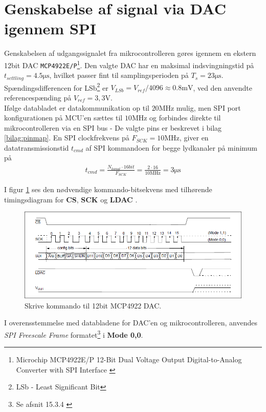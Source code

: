 \section{Genskabelse af signal via DAC igennem SPI}
Genskabelsen af udgangssignalet fra mikrocontrolleren gøres igennem en ekstern 12bit DAC \texttt{MCP4922E/P}\footnote{Microchip MCP4922E/P 12-Bit Dual Voltage Output Digital-to-Analog Converter with SPI Interface \cite{mcp4922} }.
Den valgte DAC har en maksimal indsvingningstid på $t_{settling} = \num{4.5}\si{\micro\second}$, hvilket passer fint til samplingsperioden på $T_s = 23\si{\micro\second}$. 
\\
Spændingsdifferencen for LSb\footnote{LSb - Least Significant Bit} er $ V_{LSb} = V_{ref} / 4096 \approx \num{0,8}\si{\milli\volt} $, ved den anvendte referencespænding på $V_{ref} = 3,3\si{\volt}$. 
\\
Ifølge databladet er datakommunikation op til $20\si{\mega\hertz}$ mulig, men SPI port konfigurationen på MCU'en sættes til $10\si{\mega\hertz}$ og forbindes direkte til mikrocontrolleren via en SPI bus - De valgte pins er beskrevet i bilag \ref{bilag:pinmap}. 
En SPI clockfrekvens på $F_{SCK} = 10\si{\mega\hertz}$, giver en datatransmissionstid $t_{cmd}$ af SPI kommandoen for begge lydkanaler på minimum på  
\begin{align} 
t_{cmd} = \frac{N_{kanal} \cdot 16bit}{F_{SCK}} = \frac{2 \cdot 16}{10\si{\mega\hertz}} = 3\si{\micro\second} 
\end{align} 

I figur \ref{fig:dac12bit_writecmd} ses den nødvendige kommando-bitsekvens med tilhørende timingsdiagram for \textbf{CS}, \textbf{SCK} og \textbf{LDAC}  .\\ 

\begin{figure}[h!] 
	\centering 
	\includegraphics[width=.8\textwidth]{billeder/dac12bit_writecmd.png} 
	\caption{Skrive kommando til 12bit MCP4922 DAC.\cite[s. 25]{mcp4922}} 
	\label{fig:dac12bit_writecmd} 
\end{figure} 

I overensstemmelse med databladene for DAC'en og mikrocontrolleren, anvendes \emph{SPI Freescale Frame} formatet\footnote{Se afsnit 15.3.4 \cite[s. 954]{tm4c123gh6pm}} i \textbf{Mode 0,0}. 



